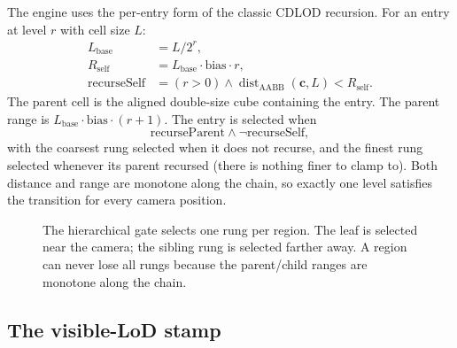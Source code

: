 The engine uses the per-entry form of the classic CDLOD recursion.  For an
entry at level $r$ with cell size $L$:
\begin{align}
  L_{\text{base}} &= L/2^r,\\
  R_{\text{self}} &= L_{\text{base}}\cdot\text{bias}\cdot r,\\
  \text{recurseSelf} &= (r>0)\land
    \operatorname{dist}_{\text{AABB}}(\mathbf{c},L) < R_{\text{self}}.
\end{align}
The parent cell is the aligned double-size cube containing the entry.
The parent range is $L_{\text{base}}\cdot\text{bias}\cdot(r+1)$.  The entry
is selected when
\begin{equation}
  \text{recurseParent} \land \lnot\text{recurseSelf},
\end{equation}
with the coarsest rung selected when it does not recurse, and the finest
rung selected whenever its parent recursed (there is nothing finer to
clamp to).  Both distance and range are monotone along the chain, so
exactly one level satisfies the transition for every camera position.

\begin{figure}[htbp]
\centering
{}
\caption{The hierarchical gate selects one rung per region.  The leaf is
selected near the camera; the sibling rung is selected farther away.  A
region can never lose all rungs because the parent/child ranges are
monotone along the chain.}
\label{fig:gate}
\end{figure}

\subsection{The visible-LoD stamp}


